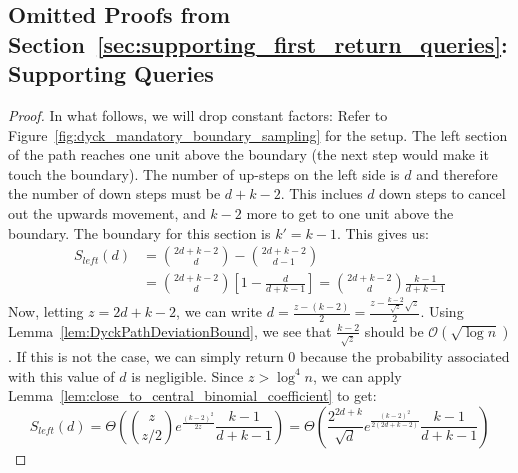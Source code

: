 \subsection{Omitted Proofs from Section~\ref{sec:supporting_first_return_queries}: Supporting  Queries}
\label{sec:omitted_supporting_first_return_queries}

\ReturnDLeftBound*
\begin{proof}
In what follows, we will drop constant factors:
Refer to Figure~\ref{fig:dyck_mandatory_boundary_sampling} for the setup.
The left section of the path reaches one unit above the boundary (the next step would make it touch the boundary).
The number of up-steps on the left side is $d$ and therefore the number of down steps must be $d + k - 2$.
This inclues $d$ down steps to cancel out the upwards movement, and $k-2$ more to get to one unit above the boundary.
The boundary for this section is $k' = k-1$. This gives us:
\begin{align}
S_{left}(d) &= \binom{2d+k-2}{d} - \binom{2d+k-2}{d-1}\\
&= \binom{2d+k-2}{d}\left[ 1-\frac{d}{d+k-1}\right] = \binom{2d+k-2}{d}\frac{k-1}{d+k-1}
\end{align}
Now, letting $z = 2d+k-2$,  we can write $d = \frac{z-(k-2)}{2} = \frac{z-\frac{k-2}{\sqrt z}\sqrt z}{2}$.
Using Lemma~\ref{lem:DyckPathDeviationBound}, we see that $\frac{k-2}{\sqrt z}$ should be $\mathcal O(\sqrt{\log n})$.
If this is not the case, we can simply return $0$ because the probability associated with this value of $d$ is negligible.
Since $z > \log^4 n$, we can apply Lemma~\ref{lem:close_to_central_binomial_coefficient} to get:
\[
S_{left}(d) = \Theta\left( \binom{z}{z/2} e^{\frac{(k-2)^2}{2z}} \frac{k-1}{d+k-1} \right)
= \Theta\left( \frac{2^{2d+k}}{\sqrt d} e^{\frac{(k-2)^2}{2(2d+k-2)}} \frac{k-1}{d+k-1} \right)
\]
\end{proof}


